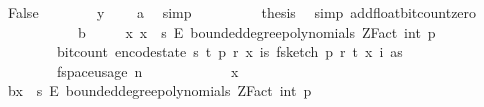 \begin{isabellebody}
\ False\isanewline
\ \ \ \ \ \ \isamarkupfalse%
\ {\isachardoublequoteopen}y\ {\isacharequal}{\kern0pt}\ {}{\isachardoublequoteclose}\ \isamarkupfalse%
\ a\ \isamarkupfalse%
\ simp\isanewline
\ \ \ \ \ \ \isamarkupfalse%
\ \isamarkupfalse%
\ {\isacharquery}{\kern0pt}thesis\ \isamarkupfalse%
\ {\isacharparenleft}{\kern0pt}simp\ add{\isacharcolon}{\kern0pt}float{\isacharunderscore}{\kern0pt}bit{\isacharunderscore}{\kern0pt}count{\isacharunderscore}{\kern0pt}zero{\isacharparenright}{\kern0pt}\isanewline
\ \ \ \ \isamarkupfalse%
\isanewline
\ \ \isamarkupfalse%
\isanewline
\isanewline
\ \ \isamarkupfalse%
\ b{\isacharcolon}{\kern0pt}\ \isanewline
\ \ \ \ {\isachardoublequoteopen}{\isasymAnd}x{\isachardot}{\kern0pt}\ x\ {\isasymin}\ {\isacharparenleft}{\kern0pt}{\isacharbraceleft}{\kern0pt}{}{\isachardot}{\kern0pt}{\isachardot}{\kern0pt}{\isacharless}{\kern0pt}s{\isacharbraceright}{\kern0pt}\ {\isasymrightarrow}\isactrlsub E\ bounded{\isacharunderscore}{\kern0pt}degree{\isacharunderscore}{\kern0pt}polynomials\ {\isacharparenleft}{\kern0pt}ZFact\ {\isacharparenleft}{\kern0pt}int\ p{\isacharparenright}{\kern0pt}{\isacharparenright}{\kern0pt}\ {}{\isacharparenright}{\kern0pt}\ {\isasymLongrightarrow}\isanewline
\ \ \ \ \ \ \ \ bit{\isacharunderscore}{\kern0pt}count\ {\isacharparenleft}{\kern0pt}encode{\isacharunderscore}{\kern0pt}state\ {\isacharparenleft}{\kern0pt}s{\isacharcomma}{\kern0pt}\ t{\isacharcomma}{\kern0pt}\ p{\isacharcomma}{\kern0pt}\ r{\isacharcomma}{\kern0pt}\ x{\isacharcomma}{\kern0pt}\ {\isasymlambda}i{\isasymin}{\isacharbraceleft}{\kern0pt}{}{\isachardot}{\kern0pt}{\isachardot}{\kern0pt}{\isacharless}{\kern0pt}s{\isacharbraceright}{\kern0pt}{\isachardot}{\kern0pt}\ f{}{\isacharunderscore}{\kern0pt}sketch\ p\ r\ t\ {\isacharparenleft}{\kern0pt}x\ i{\isacharparenright}{\kern0pt}\ as{\isacharparenright}{\kern0pt}{\isacharparenright}{\kern0pt}\ {\isasymle}\ \isanewline
\ \ \ \ \ \ \ \ f{}{\isacharunderscore}{\kern0pt}space{\isacharunderscore}{\kern0pt}usage\ {\isacharparenleft}{\kern0pt}n{\isacharcomma}{\kern0pt}\ {\isasymepsilon}{\isacharcomma}{\kern0pt}\ {\isasymdelta}{\isacharparenright}{\kern0pt}{\isachardoublequoteclose}\isanewline
\ \ \isamarkupfalse%
\ {\isacharminus}{\kern0pt}\isanewline
\ \ \ \ \isamarkupfalse%
\ x\isanewline
\ \ \ \ \isamarkupfalse%
\ b{\isacharunderscore}{\kern0pt}{}{\isacharcolon}{\kern0pt}{\isachardoublequoteopen}x\ {\isasymin}\ {\isacharbraceleft}{\kern0pt}{}{\isachardot}{\kern0pt}{\isachardot}{\kern0pt}{\isacharless}{\kern0pt}s{\isacharbraceright}{\kern0pt}\ {\isasymrightarrow}\isactrlsub E\ bounded{\isacharunderscore}{\kern0pt}degree{\isacharunderscore}{\kern0pt}polynomials\ {\isacharparenleft}{\kern0pt}ZFact\ {\isacharparenleft}{\kern0pt}int\ p{\isacharparenright}{\kern0pt}{\isacharparenright}{\kern0pt}\ {}{\isachardoublequoteclose}\isanewline

\end{isabellebody}
